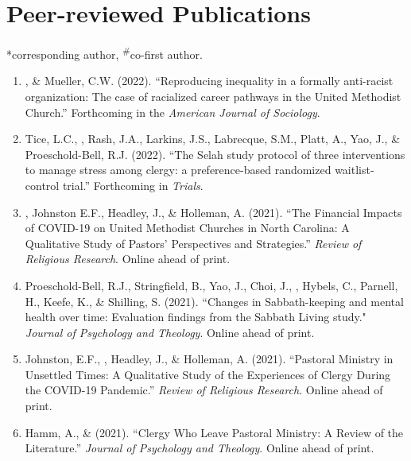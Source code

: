 \newcommand{\Revision}{\textit{under revision}}
\newcommand{\CS}{*} %
\newcommand{\CF}{\textsuperscript{\#}} %

\section*{Peer-reviewed Publications}
\CS corresponding author, \CF co-first author.

\begin{enumerate}
\item \Eagle, \& Mueller, C.W. (2022). ``Reproducing inequality in a formally anti-racist organization: The case of racialized career pathways in the United Methodist Church.'' Forthcoming in the \textit{American Journal of Sociology}.		

\item Tice, L.C., \Eagle, Rash, J.A., Larkins, J.S., Labrecque, S.M., Platt, A., Yao, J., \& Proeschold-Bell, R.J. (2022). ``The Selah study protocol of three interventions to manage stress among clergy: a preference-based randomized waitlist-control trial.''  Forthcoming in \textit{Trials}.
	
\item \Eagle, Johnston E.F., Headley, J., \& Holleman, A. (2021). ``The Financial Impacts of COVID-19 on United Methodist Churches in North Carolina: A Qualitative Study of Pastors’ Perspectives and Strategies.'' \emph{Review of Religious Research}. Online ahead of print. 

\item Proeschold-Bell, R.J., Stringfield, B., Yao, J., Choi, J., \Eagle, Hybels, C., Parnell, H., Keefe, K., \& Shilling, S. (2021). ``Changes in Sabbath-keeping and mental health over time: Evaluation findings from the Sabbath Living study." \textit{Journal of Psychology and Theology}. Online ahead of print. 
	
\item Johnston, E.F., \Eagle, Headley, J., \& Holleman, A. (2021). ``Pastoral Ministry in Unsettled Times: A Qualitative Study of the Experiences of Clergy During the COVID-19 Pandemic.'' \textit{Review of Religious Research}. Online ahead of print. 

\item Hamm, A., \&  \Eagle \hspace{.01em} (2021). ``Clergy Who Leave Pastoral Ministry: A Review of the Literature.'' \textit{Journal of Psychology and Theology}. Online ahead of print. 


\end{enumerate}
